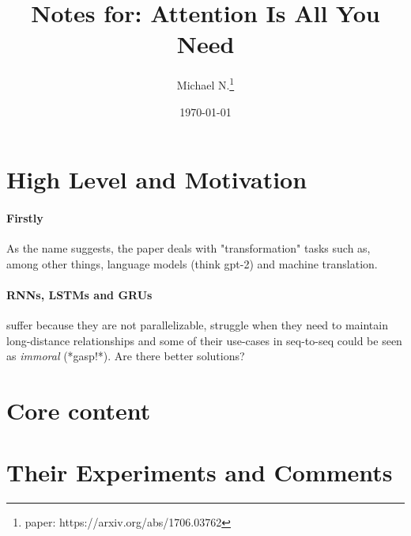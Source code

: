 \documentclass{article}
\title{Notes for: Attention Is All You Need}
\author{Michael N.\thanks{paper: https://arxiv.org/abs/1706.03762}}
\date{\today}
\begin{document}
    \maketitle
    
    \section{High Level and Motivation}
    
    \paragraph{Firstly} As the name suggests, the paper deals with "transformation" tasks such as, among other things, language models (think gpt-2) and machine translation.

    \paragraph{RNNs, LSTMs and GRUs} suffer because they are not parallelizable, struggle when they need to maintain long-distance relationships and some of their use-cases in seq-to-seq could be seen as \emph{immoral} (*gasp!*). Are there better solutions?

    \subsection{}


    \section{Core content}

    \section{Their Experiments and Comments}
\end{document}
